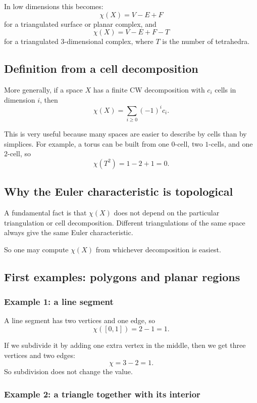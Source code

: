 \documentclass[12pt,a4paper]{article}
\theoremstyle{notespace}
\begin{document}
In low dimensions this becomes:
\[
\chi(X)=V-E+F
\]
for a triangulated surface or planar complex, and
\[
\chi(X)=V-E+F-T
\]
for a triangulated \(3\)-dimensional complex, where \(T\) is the number of tetrahedra.

\subsection{Definition from a cell decomposition}

More generally, if a space \(X\) has a finite CW decomposition with \(c_i\) cells in dimension \(i\), then
\[
\chi(X)=\sum_{i\ge 0}(-1)^i c_i.
\]

This is very useful because many spaces are easier to describe by cells than by simplices. For example, a torus can be built from one \(0\)-cell, two \(1\)-cells, and one \(2\)-cell, so
\[
\chi(T^2)=1-2+1=0.
\]

\subsection{Why the Euler characteristic is topological}

A fundamental fact is that \(\chi(X)\) does not depend on the particular triangulation or cell decomposition. Different triangulations of the same space always give the same Euler characteristic.

So one may compute \(\chi(X)\) from whichever decomposition is easiest.

\subsection{First examples: polygons and planar regions}

\subsubsection*{Example 1: a line segment}

A line segment has two vertices and one edge, so
\[
\chi([0,1])=2-1=1.
\]

If we subdivide it by adding one extra vertex in the middle, then we get three vertices and two edges:
\[
\chi=3-2=1.
\]
So subdivision does not change the value.

\subsubsection*{Example 2: a triangle together with its interior}
\end{document}
